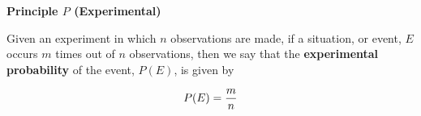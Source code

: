 {\bf Principle $P$ (Experimental)}
\vskip 6pt

Given an experiment in which $n$ observations are made, if a situation, or event, $E$ occurs $m$ times out of $n$ observations, then we say that the {\bf experimental probability} of the event, $P(E)$, is given by

$$P(E)={m\over n}$$

\vfill\eject
